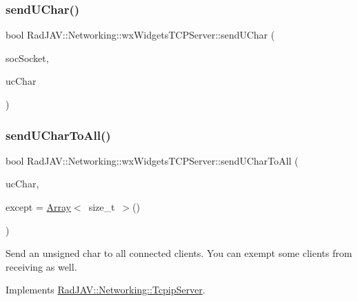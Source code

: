 \subsubsection{\texorpdfstring{send\+U\+Char()}{sendUChar()}}
{\footnotesize\ttfamily bool Rad\+J\+A\+V\+::\+Networking\+::wx\+Widgets\+T\+C\+P\+Server\+::send\+U\+Char (\begin{DoxyParamCaption}\item[{wx\+Socket\+Base $\ast$}]{soc\+Socket,  }\item[{unsigned char}]{uc\+Char }\end{DoxyParamCaption})}

\mbox{\label{class_rad_j_a_v_1_1_networking_1_1wx_widgets_t_c_p_server_a5a2d9c4355ceaac7d771475b2549b8e1}} 
\subsubsection{\texorpdfstring{send\+U\+Char\+To\+All()}{sendUCharToAll()}}
{\footnotesize\ttfamily bool Rad\+J\+A\+V\+::\+Networking\+::wx\+Widgets\+T\+C\+P\+Server\+::send\+U\+Char\+To\+All (\begin{DoxyParamCaption}\item[{unsigned char}]{uc\+Char,  }\item[{\mbox{\hyperlink{class_rad_j_a_v_1_1_array}{Array}}$<$ size\+\_\+t $>$}]{except = {\ttfamily \mbox{\hyperlink{class_rad_j_a_v_1_1_array}{Array}}$<$~size\+\_\+t~$>$()} }\end{DoxyParamCaption})\hspace{0.3cm}{\ttfamily [virtual]}}

Send an unsigned char to all connected clients. You can exempt some clients from receiving as well. 

Implements \mbox{\hyperlink{class_rad_j_a_v_1_1_networking_1_1_tcpip_server_a645c0fa1c860658c7ab04a9fcf530b9a}{Rad\+J\+A\+V\+::\+Networking\+::\+Tcpip\+Server}}.

\mbox{\label{class_rad_j_a_v_1_1_networking_1_1wx_widgets_t_c_p_server_a1a7cfa0a5fc0b546b3606d0ee682db2a}} 
